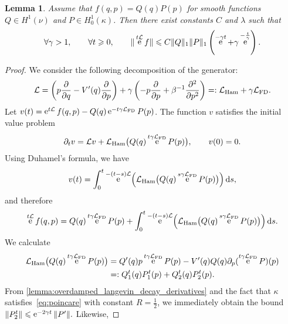 \documentclass[11pt,a4paper]{article}
\DeclareMathOperator{\e}{e}
\renewcommand{\d}{\mathrm d}
\theoremstyle{plain}
\newtheorem{lemma}{Lemma}[section]
\numberwithin{equation}{section}
\renewcommand{\leq}{\leqslant}
\renewcommand{\geq}{\geqslant}
\begin{document}
\begin{lemma}
    Assume that $f(q, p) = Q(q) P(p)$ for smooth functions $Q \in H^1(\nu)$ and $P \in H^1_0(\kappa)$.
    Then there exist constants $C$ and $\lambda$ such that
    \[
        \forall \gamma > 1, \qquad
        \forall t \geq 0, \qquad
        \norm*{\e^{t\mathcal L} f}
        \leq C \norm*{Q}_1 \norm*{P}_1
        \left( \e^{- \gamma t} + \gamma \e^{-\frac{t}{\gamma}} \right).
    \]

\end{lemma}

\begin{proof}
    We consider the following decomposition of the generator:
    \[
        \mathcal L
        = \left( p \derivative{1}{q} - \derivative*{1}[V]{q}(q) \derivative{1}{p} \right)
        + \gamma \left( - p \derivative{1}{p} + \beta^{-1} \derivative{2}{p^2} \right)
        =: \mathcal L_{\rm Ham} + \gamma \mathcal L_{\rm FD}.
    \]
    Let $v(t) = \e^{t \mathcal L} f(q, p) - Q(q) \e^{- t \gamma \mathcal L_{\rm FD}} P(p)$.
    The function $v$ satisfies the initial value problem
    \[
        \partial_t v = \mathcal L v +  \mathcal L_{\rm Ham} \bigl(Q(q) \e^{t \gamma \mathcal L_{\rm FD}} P(p)\bigr), \qquad v(0) = 0.
    \]
    Using Duhamel's formula, we have
    \[
        v(t) = \int_{0}^{t} \e^{- (t-s) \mathcal L}  \Bigl( \mathcal L_{\rm Ham} \bigl(Q(q) \e^{s \gamma \mathcal L_{\rm FD}} P(p)\bigr) \Bigr) \, \d s,
    \]
    and therefore
    \begin{equation}
        \label{eq:intermediate_decay_correlation}
        \e^{t \mathcal L} f(q,p) = Q(q) \e^{t \gamma \mathcal L_{\rm FD}} P(p)
        + \int_{0}^{t} \e^{- (t-s) \mathcal L}  \Bigl( \mathcal L_{\rm Ham} \bigl(Q(q) \e^{s \gamma \mathcal L_{\rm FD}} P(p)\bigr) \Bigr) \, \d s.
    \end{equation}
    We calculate
    \begin{align*}
        \mathcal L_{\rm Ham} \bigl(Q(q) \e^{t \gamma \mathcal L_{\rm FD}} P(p)\bigr)
        &= Q'(q) p \e^{t \gamma \mathcal L_{\rm FD}} P(p) - V'(q) Q(q) \partial_p(\e^{t \gamma \mathcal L_{\rm FD}} P) (p) \\
        &=: Q^t_1(q) P^t_1(p) + Q^t_2(q) P^t_2(p).
    \end{align*}
    From \cref{lemma:overdamped_langevin_decay_derivatives} and the fact that $\kappa$ satisfies~\eqref{eq:poincare} with constant $R = \frac{1}{2}$,
    we immediately obtain the bound
    \(
        \norm{P^t_2} \leq \e^{-2\gamma t} \norm*{P'}.
    \)
    Likewise,

\end{proof}
\end{document}

